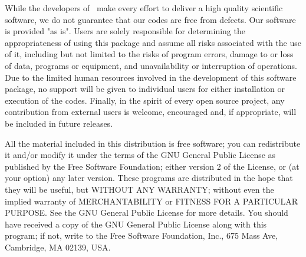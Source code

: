  While the developers of \WANT\ make
every effort to deliver a high quality scientific software, we do
not guarantee that our codes are free from defects. Our software
is provided "as is". Users are solely responsible for determining
the appropriateness of using this package and assume all risks
associated with the use of it, including but not limited to the
risks of program errors, damage to or loss of data, programs or
equipment, and unavailability or interruption of operations. Due
to the limited human resources involved in the development of this
software package, no support will be given to individual users for
either installation or execution of the codes. Finally, in the
spirit of every open source project, any contribution from
external users is welcome, encouraged and, if appropriate, will be
included in future releases.\\
  \vspace{0.25in}

 All the material included in this
distribution is free software; you can redistribute it and/or
modify it under the terms of the GNU General Public License as
published by the Free Software Foundation; either version 2 of the
License, or (at your option) any later version. These programs are
distributed in the hope that they will be useful, but WITHOUT ANY
WARRANTY; without even the implied warranty of MERCHANTABILITY or
FITNESS FOR A PARTICULAR PURPOSE. See the GNU General Public
License for more details. You should have received a copy of the
GNU General Public License along with this program; if not, write
to the Free Software Foundation, Inc., 675 Mass Ave, Cambridge, MA
02139, USA.
